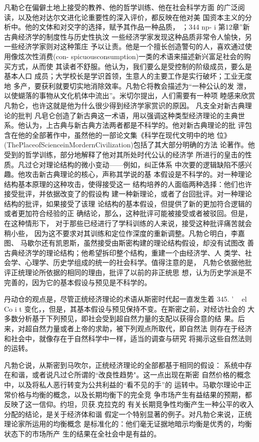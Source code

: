 凡勒仑在偏僻土地上接受的教养、他的哲学训练、他在社会科学方面
的广泛阅读，以及他对达尔文进化论重要性的深入评价，都反映在他对美
国资本主义的分析中。他的文体和对交字的选择，赋予其作品一种品质，
；344
np-
i
第12章”新古典经济学的制度性与历史性执汶
一些经济学家发现这种品质非常令人愉快，另一些经济学家则对这种策庄
予以让责。他是一个擅长创造警句的人，喜欢通过使用像炫次性消费(con-
spicuousconsumption)一类的术语来描述新兴富足社会的购买方式，从而使
其读者不舒服。他认为，我们要么是受控制的阶级成员，要么是基本人口
成员；大学校长是学识首领，生意人的主要工作是实行破坏；工业无度地
多产，要获利就要切实地消除效率。凡勃仑将教会描述为“一种公认的发
泄，以使蝴落的事物从文化机体中流出”。米切尔提出，人们需要有一种项
睦感来欣赏凡勃仑，也许这就是他为什么很少得到经济学家赏识的原因。
凡支全对新古典理论的批判
凡皂仑创造了新古典这一术语，用以强调这种类型经济理论的主典世
系。他认为，上古典与新古典方法两者都是不科学的。他对新古典理论的批
评包含在他的全部著作中，虽然他的一部论文集《科学在现代文明中的地
位》(ThePlaceofScienceinMordernCivilization)包括了其大部分明确的方法
论著作。他受到的哲学训练，部分地解释了他对其所处时代公认的经济学
所进行的皇击的性质。凡过仑对理论结构的微小变动——例如，纠正体系
中次要的逻辑缺陷不感兴趣。他攻击新古典理论的核心，声称其学说的基
本假设是不科学的。对一种理论结构基本原理的这种攻击，使得接受这一
结构培养的人面临两种选择：他们也许接受批评，并依据改变了的假设构
建一种新理论，或者了台回批评。对一种理论结构的批评，如果接受了该理
论结构的基本假设，但提供了新的更加符合逻辑的或者更加符合经验的正
确结论，那么，这种批评可能被接受或者被驳回。但是，在这种情形下，
对于那些已经进行了学科训练的人来说，接受这种批评痛苦就会稍小些，
因为这不要求对其训练和定位作深度的重新调整。凡勃仑明白，李嘉图、
马歇尔还有凯恩斯，虽然接受由斯密构建的理论结构假设，却没有试图改
善古典经济学的理论结构；他希望拆印整个结构，重建一个由经济学、人
类学、社会学、心理学、历史学组成的统一的社会科学。值得注意的是，
凡勃仑依据他批评正统理论所依据的相同的理由，批评了以前的非正统思
想，认为历史学派是不完善的，因为它的基本假设与预见是不科学的。

丹动仓的观点是，尽管正统经济理论的术语从斯密时代起一直发生着
345.
'
~
el
Co
i
t
变化，，但是，其基本假设与预见保持不变。在斯密之前，对经访社会的
大多数分析基于下列预见，即社会受到超自然力量的支配以获得合意的结
果。后来，对超自然力量或者上帝的求助，被下列观点所取代，即自然法
则存在于经济和社会中，就像存在于自然科学中一样，适当的调查与研究
将揭示这些自然法则的运转。

凡勃仑说，从斯密到马吹尔，正统经济理论的全部都基于相同的假设：
系统中存在和谐，或者说凡过仑所谓的“改良性趋势"。这一点出现在斯密
自然价格的概念中，以及将私人恶行转变为公共利益的“看不见的手”的
运转中。马歇尔理论中正常价格与均衡的概念，以及长期均衡下的完全竞
争市场产生有益结果的预期，都反映了这一信仰。约坦，贝获.克拉克的
有关长期竞争性均衡产生一种公平的收入分配的结论，是关于经济体和谐
假定一个特别显著的例子。对凡勃仑来说，正统理论家所运用的均衡概念
是标准化的：他们毫无证据地暗示均衡是优秀的，均衡状态下的市场所产
生的结果在全社会中是有益的。

